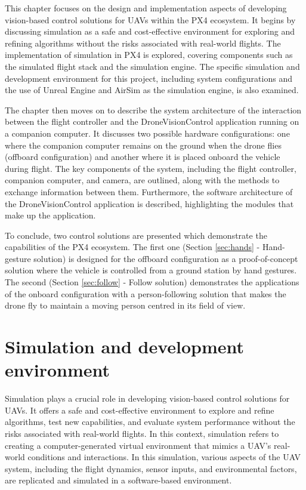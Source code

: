 This chapter focuses on the design and implementation aspects of developing vision-based control solutions for UAVs within the PX4 ecosystem. It begins by discussing simulation as a safe and cost-effective environment for exploring and refining algorithms without the risks associated with real-world flights. The implementation of simulation in PX4 is explored, covering components such as the simulated flight stack and the simulation engine. The specific simulation and development environment for this project, including system configurations and the use of Unreal Engine and AirSim as the simulation engine, is also examined.

The chapter then moves on to describe the system architecture of the interaction between the flight controller and the DroneVisionControl application running on a companion computer. It discusses two possible hardware configurations: one where the companion computer remains on the ground when the drone flies (offboard configuration) and another where it is placed onboard the vehicle during flight. The key components of the system, including the flight controller, companion computer, and camera, are outlined, along with the methods to exchange information between them. Furthermore, the software architecture of the DroneVisionControl application is described, highlighting the modules that make up the application.

To conclude, two control solutions are presented which demonstrate the capabilities of the PX4 ecosystem. The first one (Section \ref{sec:hands} - Hand-gesture solution) is designed for the offboard configuration as a proof-of-concept solution where the vehicle is controlled from a ground station by hand gestures. The second (Section \ref{sec:follow} - Follow solution) demonstrates the applications of the onboard configuration with a person-following solution that makes the drone fly to maintain a moving person centred in its field of view.

\section{Simulation and development environment}
\label{sec:devenv}
Simulation plays a crucial role in developing vision-based control solutions for UAVs. It offers a safe and cost-effective environment to explore and refine algorithms, test new capabilities, and evaluate system performance without the risks associated with real-world flights. 
In this context, simulation refers to creating a computer-generated virtual environment that mimics a UAV's real-world conditions and interactions. In this simulation, various aspects of the UAV system, including the flight dynamics, sensor inputs, and environmental factors, are replicated and simulated in a software-based environment.

